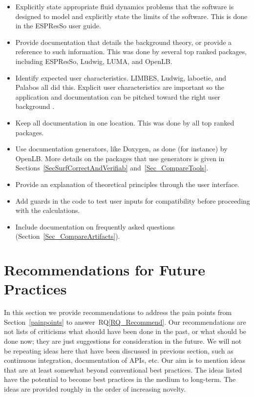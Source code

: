 \documentclass[final, 3p, times, authoryear]{elsarticle}
\newcommand{\rqref}[1]{RQ\ref{#1}}
\begin{document}
\begin{itemize}
	\item Explicitly state appropriate fluid dynamics problems that the software
	is designed to model and explicitly state the limits of the software. This
	is done in the ESPResSo user guide.
	\item Provide documentation that details the background theory, or provide a
	reference to such information. This was done by several top ranked packages,
	including ESPResSo, Ludwig, LUMA, and OpenLB.
	\item Identify expected user characteristics. LIMBES, Ludwig, laboetie, and
	Palabos all did this. Explicit user characteristics are important so the
	application and documentation can be pitched toward the right user
	background \citep{SmithEtAl2007}.
	\item Keep all documentation in one location. This was done by all top
	ranked packages.
	\item Use documentation generators, like Doxygen, as done (for instance) by
	OpenLB.  More details on the packages that use generators is given in
	Sections~\ref{SecSurfCorrectAndVerifiab} and~\ref{Sec_CompareTools}.
	\item Provide an explanation of theoretical principles through the user interface.
	\item Add guards in the code to test user inputs for compatibility before
	proceeding with the calculations.
	\item Include documentation on frequently asked questions (Section~\ref{Sec_CompareArtifacts}).
\end{itemize}

\section{Recommendations for Future Practices} \label{Sec_Recommendations}

In this section we provide recommendations to address the pain points from
Section~\ref{painpoints} to answer~\rqref{RQ_Recommend}.  Our recommendations
are not lists of criticisms what should have been done in the past, or what
should be done now; they are just suggestions for consideration in the future.
We will not be repeating ideas here that have been discussed in previous
section, such as continuous integration, documentation of APIs, etc.  Our aim is
to mention ideas that are at least somewhat beyond conventional best practices.
The ideas listed have the potential to become best practices in the medium to
long-term.  The ideas are provided roughly in the order of increasing novelty.
\end{document}
